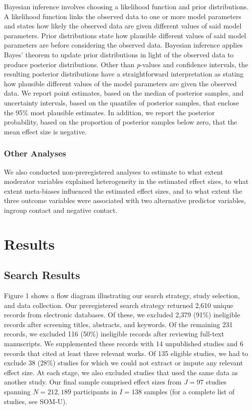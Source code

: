 \documentclass[12pt, letterpaper]{article}
\begin{document}
Bayesian inference involves choosing a likelihood function and prior
distributions. A likelihood function links the observed data to one or
more model parameters and states how likely the observed data are given
different values of said model parameters. Prior distributions state how
plausible different values of said model parameters are before
considering the observed data. Bayesian inference applies Bayes' theorem
to update prior distributions in light of the observed data to produce
posterior distributions. Other than \emph{p}-values and confidence
intervals, the resulting posterior distributions have a straightforward
interpretation as stating how plausible different values of the model
parameters are given the observed data. We report point estimates, based
on the median of posterior samples, and uncertainty intervals, based on
the quantiles of posterior samples, that enclose the 95\% most plausible
estimates. In addition, we report the posterior probability, based on
the proportion of posterior samples below zero, that the mean effect
size is negative.

\hypertarget{other-analyses}{%
\subsubsection{Other Analyses}\label{other-analyses}}

We also conducted non-preregistered analyses to estimate to what extent
moderator variables explained heterogeneity in the estimated effect
sizes, to what extent meta-biases influenced the estimated effect sizes,
and to what extent the three outcome variables were associated with two
alternative predictor variables, ingroup contact and negative contact.

\hypertarget{results}{%
\section{Results}\label{results}}

\hypertarget{search-results}{%
\subsection{Search Results}\label{search-results}}

Figure 1 shows a flow diagram illustrating our search strategy, study
selection, and data collection. Our preregistered search strategy
returned 2,610 unique records from electronic databases. Of these, we
excluded 2,379 (91\%) ineligible records after screening titles,
abstracts, and keywords. Of the remaining 231 records, we excluded 116
(50\%) ineligible records after reviewing full-text manuscripts. We
supplemented these records with 14 unpublished studies and 6 records
that cited at least three relevant works. Of 135 eligible studies, we
had to exclude 38 (28\%) studies for which we could not extract or
impute any relevant effect size. At each stage, we also excluded studies
that used the same data as another study. Our final sample comprised
effect sizes from \(J = 97\) studies spanning \(N = 212,189\)
participants in \(I = 138\) samples (for a complete list of studies, see
SOM-U).
\end{document}
